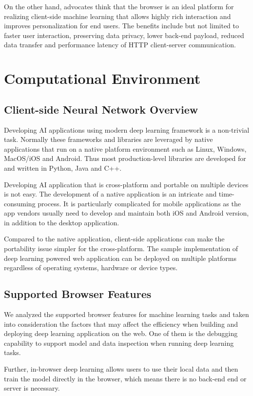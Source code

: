 On the other hand, advocates think that the browser is an ideal platform for realizing client-side machine learning that allows highly rich interaction and improves personalization for end users. The benefits include but not limited to faster user interaction, preserving data privacy, lower back-end payload, reduced data transfer and performance latency of HTTP client-server communication.

\section{Computational Environment}

\subsection{Client-side Neural Network Overview}
Developing AI applications using modern deep learning framework is a non-trivial task. Normally these frameworks and libraries are leveraged by native applications that run on a native platform environment such as Linux, Windows, MacOS/iOS and Android. Thus most production-level libraries are developed for and written in Python, Java and C++. 

Developing AI application that is cross-platform and portable on multiple devices is not easy. The development of a native application is an intricate and time-consuming process. It is particularly complicated for mobile applications as the app vendors usually need to develop and maintain both iOS and Android version, in addition to the desktop application.

Compared to the native application, client-side applications can make the portability issue simpler for the cross-platform. The sample implementation of deep learning powered web application can be deployed on multiple platforms regardless of operating systems, hardware or device types.

\subsection{Supported Browser Features}
We analyzed the supported browser features for machine learning tasks and taken into consideration the factors that may affect the efficiency when building and deploying deep learning application on the web. One of them is the debugging capability to support model and data inspection when running deep learning tasks.

Further, in-browser deep learning allows users to use their local data and then train the model directly in the browser, which means there is no back-end end or server is necessary. 

